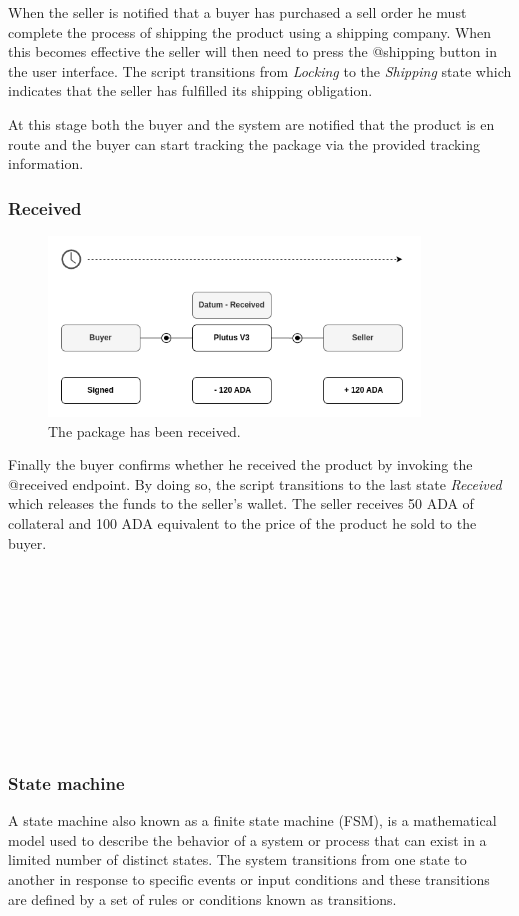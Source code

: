 \documentclass[12pt]{article}
\begin{document}
When the seller is notified that a buyer has purchased a sell order he must complete the process of shipping the product using a shipping company. When this becomes effective the seller will then need to press the @shipping button in the user interface.
The script transitions from \emph{Locking} to the \emph{Shipping} state which indicates that the seller has fulfilled its shipping obligation.

At this stage both the buyer and the system are notified that the product is en route and the buyer can start tracking the package via the provided tracking information.

\subsubsection { Received }

\begin{figure}[ht]
  \centering
  \includegraphics[width=0.88\textwidth, keepaspectratio]{4.png}
  \caption{The package has been received.}
  \label{fig:delivered}
\end{figure}

Finally the buyer confirms whether he received the product by invoking the @received endpoint. By doing so, the script transitions to the last state \emph{Received} which releases the funds to the seller's wallet. The seller receives 50 ADA of collateral and 100 ADA equivalent to the price of the product he sold to the buyer.
\\
\\
\\
\\
\\
\\
\\
\\
\\
\\
\\


\subsubsection { State machine }
A state machine also known as a finite state machine (FSM), is a mathematical model used to describe the behavior of a system or process that can exist in a limited number of distinct states. The system transitions from one state to another in response to specific events or input conditions and these transitions are defined by a set of rules or conditions known as transitions.
\end{document}
